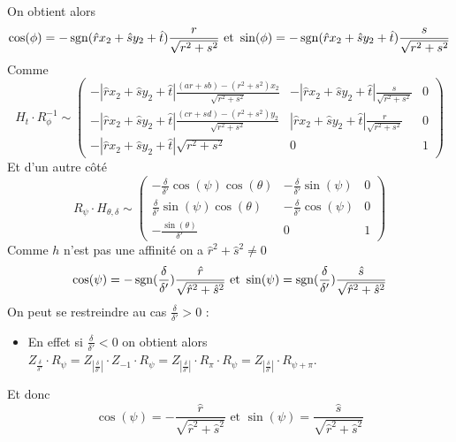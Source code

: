  On obtient alors 
 \begin{equation*}
 \cos( \phi )= -\operatorname{sgn}(\hat r x_2 +\hat s y_2 +\hat t) \frac{r}{\sqrt{r^2 + s^2}} \text{ et } \sin( \phi )= -\operatorname{sgn}(\hat r x_2 +\hat s y_2 +\hat t) \frac{s}{\sqrt{r^2 + s^2}}
 \end{equation*}
 Comme 
 \begin{equation*}
H_t \cdot R_{\phi}^{-1} \sim
 \begin{pmatrix}
 -|\hat r x_2 +\hat s y_2 +\hat t|\frac{(ar+sb)-(r^2 + s^2)x_2}{\sqrt{r^2 + s^2}}&-|\hat r x_2 +\hat s y_2 +\hat t|\frac{\hat s}{\sqrt{r^2 + s^2}}&0\\
 -|\hat r x_2 +\hat s y_2 +\hat t|\frac{(cr+sd)-(r^2 + s^2)y_2}{\sqrt{r^2 + s^2}}&|\hat r x_2 +\hat s y_2 +\hat t|\frac{r}{\sqrt{r^2 + s^2}}&0\\
 -|\hat r x_2 +\hat s y_2 +\hat t|\sqrt{r^2 + s^2}&0&1
 \end{pmatrix}
 \end{equation*}
 Et d'un autre côté 
 \begin{equation*}
R_{\psi} \cdot H_{\theta,\delta}  \sim 
 \begin{pmatrix}
 -\frac{\delta}{\delta'}\cos(\psi)\cos(\theta)&
-\frac{\delta}{\delta'}\sin(\psi)&
0\\
\frac{\delta}{\delta'}\sin(\psi)\cos(\theta)&
-\frac{\delta}{\delta'}\cos(\psi)&
0\\
-\frac{\sin(\theta)}{\delta'}&
0&
1
 \end{pmatrix}
 \end{equation*}
Comme $h$ n'est pas une affinité on a $\hat r^2 + \hat s^2 \ne 0$ 
 \begin{equation*}
  \cos( \psi ) =- \operatorname{sgn}(\frac{\delta}{\delta'})\frac{\hat r}{\sqrt{\hat r^2 + \hat s^2}}\text{ et } \sin( \psi ) = \operatorname{sgn}(\frac{\delta}{\delta'})\frac{\hat s}{\sqrt{\hat r^2 + \hat s^2}}
 \end{equation*}
On peut se restreindre au cas $\frac{\delta}{\delta'}>0$ :\\
\begin{itemize}
\item En effet si $\frac{\delta}{\delta'}<0$ on obtient alors $Z_{\frac{\delta}{\delta'}} \cdot R_{\psi}=Z_{\left|\frac{\delta}{\delta'}\right|}\cdot Z_{-1} \cdot R_{\psi}=Z_{\left|\frac{\delta}{\delta'}\right|}\cdot R_{\pi} \cdot R_{\psi}=Z_{\left|\frac{\delta}{\delta'}\right|}\cdot R_{\psi+\pi}$.
\end{itemize}
Et donc 
 \begin{equation*}
  \cos( \psi ) =- \frac{\hat r}{\sqrt{\hat r^2 + \hat s^2}} \text{ et } \sin( \psi ) = \frac{\hat s}{\sqrt{\hat r^2 + \hat s^2}}
 \end{equation*}



